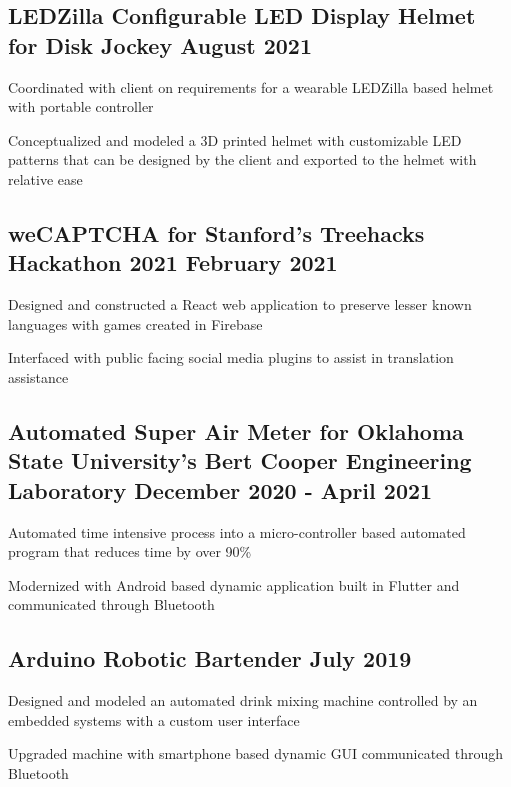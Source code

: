 \subsection{{LEDZilla Configurable LED Display Helmet for Disk Jockey \hfill August 2021}}
\begin{zitemize}
\item Coordinated with client on requirements for a wearable LEDZilla based helmet with portable controller
\item Conceptualized and modeled a 3D printed helmet with customizable LED patterns that can be designed by the client and exported to the helmet with relative ease
\end{zitemize}

\subsection{{weCAPTCHA for Stanford’s Treehacks Hackathon 2021 \hfill February 2021}}
\begin{zitemize}
\item Designed and constructed a React web application to preserve lesser known languages with games created in Firebase
\item Interfaced with public facing social media plugins to assist in translation assistance
\end{zitemize}

\subsection{{Automated Super Air Meter for Oklahoma State University’s Bert Cooper Engineering Laboratory \hfill December 2020 - April 2021}}
\begin{zitemize}
\item Automated time intensive process into a micro-controller based automated program that reduces time by over 90\%
\item Modernized with Android based dynamic application built in Flutter and communicated through Bluetooth 
\end{zitemize}

\subsection{{Arduino Robotic Bartender  \hfill July 2019}}
\begin{zitemize}
\item Designed and modeled an automated drink mixing machine controlled by an embedded systems with a custom user interface
\item Upgraded machine with smartphone based dynamic GUI communicated through Bluetooth
\end{zitemize}


